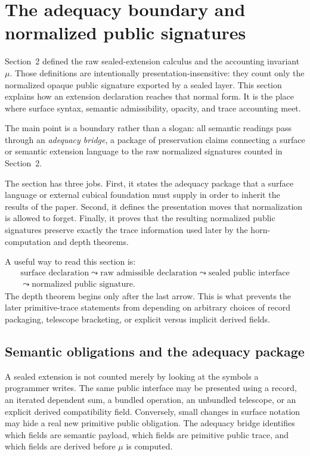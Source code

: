 \documentclass{lmcs}
\begin{document}
\section{The adequacy boundary and normalized public signatures}

Section~2 defined the raw sealed-extension calculus and the accounting invariant \(\mu\).
Those definitions are intentionally presentation-insensitive: they count only the normalized
opaque public signature exported by a sealed layer.  This section explains how an extension
declaration reaches that normal form.  It is the place where surface syntax, semantic
admissibility, opacity, and trace accounting meet.

The main point is a boundary rather than a slogan: all semantic readings pass through an
\emph{adequacy bridge}, a package of preservation claims connecting a surface or semantic
extension language to the raw normalized signatures counted in Section~2.

The section has three jobs.  First, it states the adequacy package that a surface language or
external cubical foundation must supply in order to inherit the results of the paper.  Second,
it defines the presentation moves that normalization is allowed to forget.  Finally, it proves
that the resulting normalized public signatures preserve exactly the trace information used
later by the horn-computation and depth theorems.

A useful way to read this section is:
\[
\begin{gathered}
\text{surface declaration}
\leadsto
\text{raw admissible declaration}
\leadsto
\text{sealed public interface}\\
\leadsto
\text{normalized public signature}.
\end{gathered}
\]
The depth theorem begins only after the last arrow.  This is what prevents the later
primitive-trace statements from depending on arbitrary choices of record packaging, telescope
bracketing, or explicit versus implicit derived fields.

\subsection{Semantic obligations and the adequacy package}

A sealed extension is not counted merely by looking at the symbols a programmer writes.  The
same public interface may be presented using a record, an iterated dependent sum, a bundled
operation, an unbundled telescope, or an explicit derived compatibility field.  Conversely,
small changes in surface notation may hide a real new primitive public obligation.  The
adequacy bridge identifies which fields are semantic payload, which fields are primitive
public trace, and which fields are derived before \(\mu\) is computed.
\end{document}
